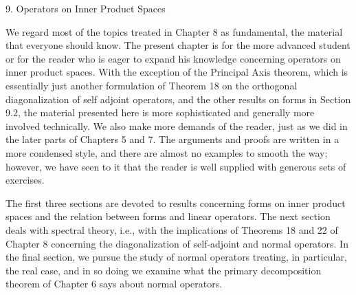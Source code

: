 9. Operators on Inner Product Spaces

We regard most of the topics treated in Chapter 8 as fundamental, the material that everyone should know. The present chapter is for the more advanced student or for the reader who is eager to expand his knowledge concerning operators on inner product spaces. With the exception of the Principal Axis theorem, which is essentially just another formulation of Theorem 18 on the orthogonal diagonalization of self adjoint operators, and the other results on forms in Section 9.2, the material presented here is more sophisticated and generally more involved technically. We also make more demands of the reader, just as we did in the later parts of Chapters 5 and 7. The arguments and proofs are written in a more condensed style, and there are almost no examples to smooth the way; however, we have seen to it that the reader is well supplied with generous sets of exercises.

The first three sections are devoted to results concerning forms on inner product spaces and the relation between forms and linear operators. The next section deals with spectral theory, i.e., with the implications of Theorems 18 and 22 of Chapter 8 concerning the diagonalization of self-adjoint and normal operators. In the final section, we pursue the study of normal operators treating, in particular, the real case, and in so doing we examine what the primary decomposition theorem of Chapter 6 says about normal operators.

 